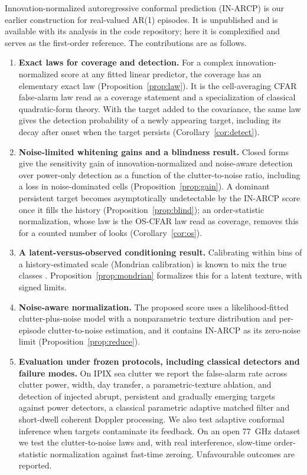 \documentclass[journal]{IEEEtran}
\begin{document}
Innovation-normalized autoregressive conformal prediction (IN-ARCP) is our earlier construction for real-valued AR(1) episodes. It is unpublished and is available with its analysis in the code repository; here it is complexified and serves as the first-order reference. The contributions are as follows.
\begin{enumerate}[leftmargin=*,itemsep=2pt]
\item \textbf{Exact laws for coverage and detection.} For a complex innovation-normalized score at any fitted linear predictor, the coverage has an elementary exact law (Proposition~\ref{prop:law}). It is the cell-averaging CFAR false-alarm law read as a coverage statement and a specialization of classical quadratic-form theory. With the target added to the covariance, the same law gives the detection probability of a newly appearing target, including its decay after onset when the target persists (Corollary~\ref{cor:detect}).
\item \textbf{Noise-limited whitening gains and a blindness result.} Closed forms give the sensitivity gain of innovation-normalized and noise-aware detection over power-only detection as a function of the clutter-to-noise ratio, including a loss in noise-dominated cells (Proposition~\ref{prop:gain}). A dominant persistent target becomes asymptotically undetectable by the IN-ARCP score once it fills the history (Proposition~\ref{prop:blind}); an order-statistic normalization, whose law is the OS-CFAR law read as coverage, removes this for a counted number of looks (Corollary~\ref{cor:os}).
\item \textbf{A latent-versus-observed conditioning result.} Calibrating within bins of a history-estimated scale (Mondrian calibration) is known to mix the true classes \cite{dewolf2025}. Proposition~\ref{prop:mondrian} formalizes this for a latent texture, with signed limits.
\item \textbf{Noise-aware normalization.} The proposed score uses a likelihood-fitted clutter-plus-noise model with a nonparametric texture distribution and per-episode clutter-to-noise estimation, and it contains IN-ARCP as its zero-noise limit (Proposition~\ref{prop:reduce}).
\item \textbf{Evaluation under frozen protocols, including classical detectors and failure modes.} On IPIX sea clutter we report the false-alarm rate across clutter power, width, day transfer, a parametric-texture ablation, and detection of injected abrupt, persistent and gradually emerging targets against power detectors, a classical parametric adaptive matched filter and short-dwell coherent Doppler processing. We also test adaptive conformal inference when targets contaminate its feedback. On an open 77~GHz dataset we test the clutter-to-noise laws and, with real interference, slow-time order-statistic normalization against fast-time zeroing. Unfavourable outcomes are reported.
\end{enumerate}
\end{document}
